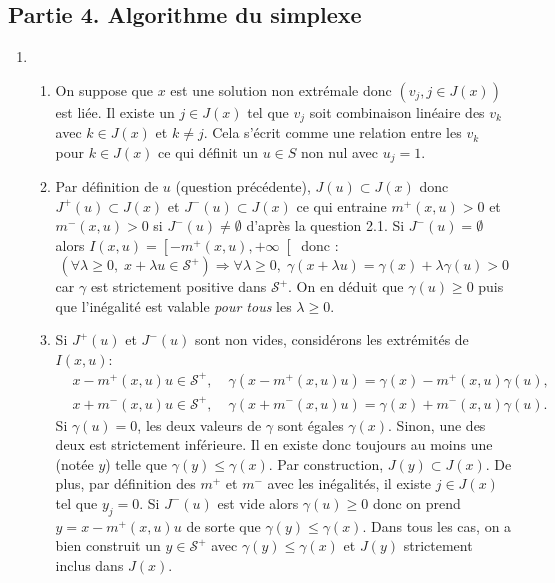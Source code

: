 \subsection*{Partie 4. Algorithme du simplexe}
\begin{enumerate}
  \item 
\begin{enumerate}
  \item On suppose que $x$ est une solution non extrémale donc $\left(v_j, j\in J(x)\right)$ est liée. Il existe un $j \in J(x)$ tel que $v_j$ soit combinaison linéaire des $v_k$ avec $k \in J(x)$ et $k \neq j$. Cela s'écrit comme une relation entre les $v_k$ pour $k \in J(x)$ ce qui définit un $u\in S$ non nul avec $u_j = 1$.
  \item Par définition de $u$ (question précédente), $J(u) \subset J(x)$ donc $J^+(u) \subset J(x)$ et $J^-(u) \subset J(x)$ ce qui entraine $m^+(x,u)>0$ et $m^-(x,u)>0$ si $J^-(u) \neq \emptyset$ d'après la question 2.1.\newline
  Si $J^-(u) = \emptyset$ alors $I(x,u) = \left[-m^+(x,u), + \infty \right[$ donc :
\[
  \left( \forall \lambda \geq 0, \; x+ \lambda u \in \mathcal{S}^+\right) \Rightarrow \forall \lambda \geq 0,\; \gamma(x+ \lambda u) = \gamma(x) + \lambda \gamma(u) > 0  
\]
car $\gamma$ est strictement positive dans $\mathcal{S}^+$. On en déduit que $\gamma(u) \geq 0$ puis que l'inégalité est valable \emph{pour tous} les $\lambda \geq 0$. 
  \item Si $J^+(u)$ et $J^-(u)$ sont non vides, considérons les extrémités de $I(x,u)$:
\[
\begin{aligned}
  &x - m^+(x,u)u \in \mathcal{S}^+,&\; \gamma(x - m^+(x,u)u) = \gamma(x) - m^+(x,u)\gamma(u), \\
  &x + m^-(x,u)u \in \mathcal{S}^+,&\; \gamma(x + m^-(x,u)u) = \gamma(x) + m^-(x,u)\gamma(u).
\end{aligned}
\]
Si $\gamma(u)=0$, les deux valeurs de $\gamma$ sont égales $\gamma(x)$. Sinon, une des deux est strictement inférieure. Il en existe donc toujours au moins une (notée $y$) telle que $\gamma(y) \leq \gamma(x)$.\newline
Par construction, $J(y) \subset J(x)$. De plus, par définition des $m^+$ et $m^-$ avec les inégalités, il existe $j \in J(x)$ tel que $y_j = 0$.\newline
Si $J^-(u)$ est vide alors $\gamma(u)\geq 0$ donc on prend $y = x - m^+(x,u)u$ de sorte que $\gamma(y) \leq \gamma(x)$.\newline
Dans tous les cas, on a bien construit un $y\in \mathcal{S}^+$ avec $\gamma(y) \leq \gamma(x)$ et $J(y)$ strictement inclus dans $J(x)$.
\end{enumerate}


\end{enumerate}
